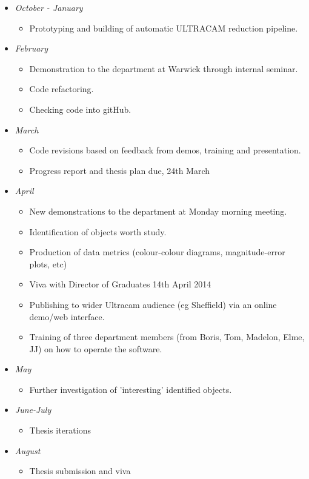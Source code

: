 \documentclass[a4paper,10pt]{article}
\begin{document}
\begin{itemize}
	\item \emph{October - January}
	\begin{itemize} 
		\item Prototyping and building of automatic ULTRACAM reduction pipeline.
	\end{itemize}
	\item \emph{February}
	\begin{itemize} 
		\item Demonstration to the department at Warwick through internal seminar.
		\item Code refactoring.
		\item Checking code into gitHub.
	\end{itemize}
	\item \emph{March}
	\begin{itemize} 
	      \item Code revisions based on feedback from demos, training and presentation.
	      \item Progress report and thesis plan due, 24th March
	\end{itemize}
	\item \emph{April}
	\begin{itemize} 
	      \item New demonstrations to the department at Monday morning meeting.
	      \item Identification of objects worth study.
	      \item Production of data metrics (colour-colour diagrams, magnitude-error plots, etc)
	      \item Viva with Director of Graduates 14th April 2014
	      \item Publishing to wider Ultracam audience (eg Sheffield) via an online demo/web interface.
	      \item Training of three department members (from Boris, Tom, Madelon, Elme, JJ) on how to operate the software.
	\end{itemize}
	\item \emph{May}
	\begin{itemize} 
	      \item Further investigation of 'interesting' identified objects.
	\end{itemize}
	\item \emph{June-July}
	\begin{itemize} 
	      \item Thesis iterations
	\end{itemize}
	\item \emph{August}
	\begin{itemize} 
	      \item Thesis submission and viva
	\end{itemize}
 \end{itemize}
\end{document}
